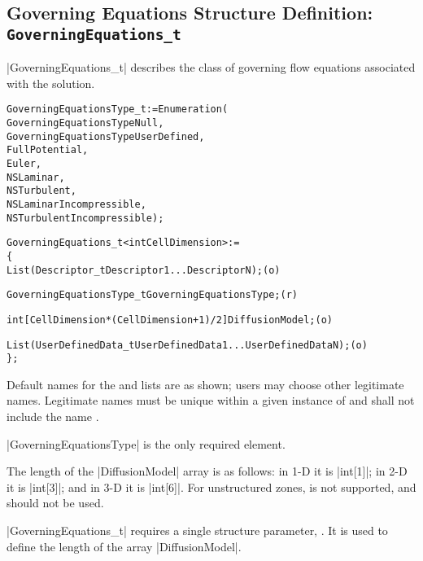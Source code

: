 \subsection{Governing Equations Structure Definition: \texttt{GoverningEquations\_t}}
\label{s:GoverningEquations}

|GoverningEquations_t| describes the class of governing flow equations
associated with the solution.  
\begin{alltt}
  GoverningEquationsType\_t := Enumeration(
    GoverningEquationsTypeNull,
    GoverningEquationsTypeUserDefined,
    FullPotential,
    Euler,
    NSLaminar,
    NSTurbulent,
    NSLaminarIncompressible,
    NSTurbulentIncompressible ) ;

  GoverningEquations\_t< int CellDimension > :=
    \{
    List( Descriptor\_t Descriptor1 ... DescriptorN ) ;                      (o)

    GoverningEquationsType\_t GoverningEquationsType ;                       (r)
    
    int[CellDimension*(CellDimension + 1)/2] DiffusionModel ;               (o)

    List( UserDefinedData\_t UserDefinedData1 ... UserDefinedDataN ) ;       (o)
    \} ;
\end{alltt}

\begin{notes}
\item
 Default names for the  and
 lists are as shown; users may choose other legitimate names.
 Legitimate names must be unique within a given instance of
  and shall not include the name
 .
\item
 |GoverningEquationsType| is the only required element.
\item
 The length of the |DiffusionModel| array is as follows: in 1-D it is
 |int[1]|; in 2-D it is |int[3]|; and in 3-D it is |int[6]|.
 For unstructured zones,  is not supported, and
 should not be used.
\end{notes}

|GoverningEquations_t| requires a single structure parameter,
.
It is used to define the length of the array |DiffusionModel|.

